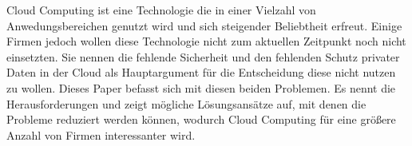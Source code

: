 Cloud Computing ist eine Technologie die in einer Vielzahl von Anwedungsbereichen genutzt wird und sich steigender Beliebtheit erfreut. Einige Firmen jedoch wollen diese Technologie nicht zum aktuellen Zeitpunkt noch nicht einsetzten. Sie nennen die fehlende Sicherheit und den fehlenden Schutz privater Daten in der Cloud als Hauptargument für die Entscheidung diese nicht nutzen zu wollen. Dieses Paper befasst sich mit diesen beiden Problemen. Es nennt die Herausforderungen und zeigt mögliche Lösungsansätze auf, mit denen die Probleme reduziert werden können, wodurch Cloud Computing für eine größere Anzahl von Firmen interessanter wird.
